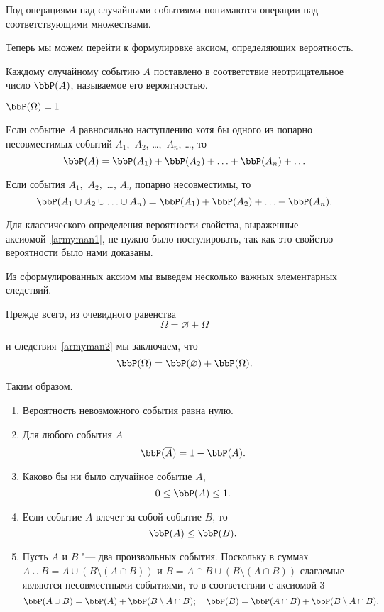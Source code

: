 Под операциями над случайными событиями понимаются операции над соответствующими множествами. 

Теперь мы можем перейти к формулировке аксиом, определяющих вероятность.
\begin{axiome} 
Каждому случайному событию $A$ поставлено в соответствие неотрицательное число $\bbP(A)$, называемое его вероятностью.
\end{axiome}
\begin{axiome} \label{armyman1}
$\bbP(\Omega) = 1$
\end{axiome}
\begin{axiome}
Если событие $A$ равносильно наступлению хотя бы одного из попарно несовместимых событий $A_1$,~$A_2$, \ldots,~$A_n$, \ldots, то
$$
\bbP(A) = \bbP(A_1) + \bbP(A_2) + \ldots + \bbP(A_n) + \ldots
$$
\end{axiome}
\begin{cons}\label{armyman2} 
Если события $A_1$,~$A_2$,~\ldots, $A_n$ попарно несовместимы, то 
$$
\bbP(A_1 \cup A_2 \cup \ldots \cup A_n) = \bbP(A_1) + \bbP(A_2) + \ldots + \bbP(A_n).
$$
\end{cons}
Для классического определения вероятности свойства, выраженные аксиомой~\ref{armyman1}, не нужно было постулировать, так как это свойство вероятности было нами доказаны.

Из сформулированных аксиом мы выведем несколько важных элементарных следствий.

Прежде всего, из очевидного равенства
$$
\Omega = \varnothing + \Omega
$$

и следствия~\ref{armyman2} мы заключаем, что
$$
\bbP(\Omega) = \bbP(\varnothing) + \bbP(\Omega).
$$

Таким образом.
\begin{enumerate}
\item
Вероятность невозможного события равна нулю.
\item	
Для любого события $A$
$$
\bbP(\overline{A}) = 1 - \bbP(A).
$$
\item
Каково бы ни было случайное событие $A$,
$$
0 \le \bbP(A) \le 1.
$$
\item
Если событие $A$ влечет за собой событие $B$, то
$$
\bbP(A) \le \bbP(B).
$$
\item
Пусть $A$ и $B$ "--- два произвольных события. Поскольку в суммах $A \cup B = A \cup (B \setminus (A\cap B))$ и $B = A\cap B \cup (B \setminus (A\cap B))$ слагаемые являются несовместными событиями, то в соответствии с аксиомой 3
$$
\bbP(A \cup B) = \bbP(A) + \bbP(B \setminus A\cap B);\quad \bbP(B) = \bbP(A\cap B) + \bbP(B \setminus A\cap B).
$$
\end{enumerate}


